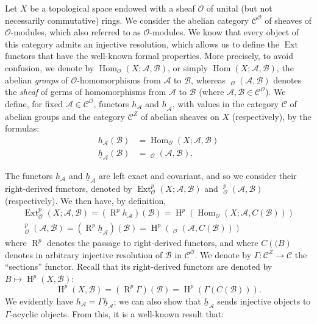 \documentclass{article}
\theoremstyle{plain}
\theoremstyle{definition}
\newcommand{\sh}{\mathscr}
\newcommand{\cat}{\mathcal}
\DeclareMathOperator{\Ext}{Ext}
\DeclareMathOperator{\Hom}{Hom}
\DeclareMathOperator{\shExt}{\underline{Ext}}
\DeclareMathOperator{\shHom}{\underline{Hom}}
\DeclareMathOperator{\RR}{R}
\DeclareMathOperator{\HH}{H}
\newcommand{\oldpage}[1]{\marginpar{\footnotesize$\Big\vert$ \textit{p.~#1}}}
\begin{document}
Let $X$ be a topological space endowed with a sheaf $\sh{O}$ of unital (but not necessarily commutative) rings.
We consider the abelian category $\cat{C}^\sh{O}$ of sheaves of $\sh{O}$-modules, which also referred to as $\sh{O}$-modules.
We know that every object of this category admits an injective resolution, which allows us to define the $\Ext$ functors that have the well-known formal properties.
More precisely, to avoid confusion, we denote by $\Hom_\sh{O}(X;\sh{A},\sh{B})$, or simply $\Hom(X;\sh{A},\sh{B})$, the abelian \emph{groups} of $\sh{O}$-homomorphisms from $\sh{A}$ to $\sh{B}$, whereas $\shHom_\sh{O}(\sh{A},\sh{B})$ denotes the \emph{sheaf} of germs of homomorphisms from $\sh{A}$ to $\sh{B}$ (where $\sh{A},\sh{B}\in \cat{C}^\sh{O}$).
We define, for fixed $\sh{A}\in \cat{C}^\sh{O}$, functors $h_\sh{A}$ and $\underline{h}_\sh{A}$, with values in the category $\cat{C}$ of abelian groups and the category $\cat{C}^Z$ of abelian sheaves on $X$ (respectively), by the formulas:
\[
\label{1.1}
  \begin{aligned}
    h_\sh{A}(\sh{B}) &= \Hom_\sh{O}(X;\sh{A},\sh{B})
  \\\underline{h}_\sh{A}(\sh{B}) &= \shHom_\sh{O}(\sh{A},\sh{B}).
  \end{aligned}
\tag{1.1}
\]

The functors $h_\sh{A}$ and $\underline{h}_\sh{A}$ are left exact and covariant, and so we consider their right-derived functors, denoted by $\Ext_\sh{O}^p(X;\sh{A},\sh{B})$ and $\shExt_\sh{O}^p(\sh{A},\sh{B})$ (respectively).
We then have, by definition,
\[
\label{1.2}
  \begin{gathered}
    \Ext_\sh{O}^p(X;\sh{A},\sh{B}) = (\RR^p h_\sh{A})(\sh{B}) = \HH^p(\Hom_\sh{O}(X;\sh{A},C(\sh{B})))
  \\\shExt_\sh{O}^p(\sh{A},\sh{B}) = (\RR^p \underline{h}_\sh{A})(\sh{B}) = \HH^p(\shHom_\sh{O}(\sh{A},C(\sh{B})))
  \end{gathered}
\tag{1.2}
\]
where $\RR^p$ denotes the passage to right-derived functors, and where $C(\sh(B)$ denotes in arbitrary injective resolution of $\sh{B}$ in $\cat{C}^\sh{O}$.
We denote by $\Gamma\colon\cat{C}^Z\to\cat{C}$ the ``sections'' functor.
Recall that its right-derived functors are denoted by $B\mapsto\HH^p(X,\sh{B})$:
\oldpage{149-02}
\[
\label{1.3}
  \HH^p(X,\sh{B}) = (\RR^p\Gamma)(\sh{B}) = \HH^p(\Gamma(C(\sh{B}))).
\tag{1.3}
\]
We evidently have $h_\sh{A}=\Gamma\underline{h}_\sh{A}$;
we can also show that $\underline{h}_\sh{A}$ sends injective objects to $\Gamma$-acyclic objects.
From this, it is a well-known result that:
\end{document}
